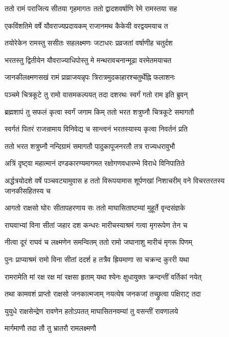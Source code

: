\twolineshloka
{ततो रामं पराजित्य सीतया गृहमागतः}
{ततो द्वादशवर्षाणि रेमे रामस्तया सह}%

\twolineshloka
{एकविंशतिमे वर्षे यौवराज्यप्रदायकम्}
{राजानमथ कैकेयी वरद्वयमयाच त}%

\twolineshloka
{तयोरेकेन रामस्तु ससीतः सहलक्ष्मणः}
{जटाधरः प्रव्रजतां वर्षाणीह चतुर्दश}%

\twolineshloka
{भरतस्तु द्वितीयेन यौवराज्याधिपोस्तु मे}
{मन्थरावचनान्मूढा वरमेतमयाचत}%

\twolineshloka
{जानकीलक्ष्मणसखं रामं प्राव्राजयन्नृपः}
{त्रिरात्रमुदकाहारश्चतुर्थेह्नि फलाशनः}%

\twolineshloka
{पञ्चमे चित्रकूटे तु रामो वासमकल्पयत्}
{तदा दशरथः स्वर्गं गतो राम इति ब्रुवन्}%

\twolineshloka
{ब्रह्मशापं तु सफलं कृत्वा स्वर्गं जगाम किम्}
{ततो भरत शत्रुघ्नौ चित्रकूटे समागतौ}%

\twolineshloka
{स्वर्गतं पितरं राजन्रामाय विनिवेद्य च}
{सान्त्वनं भरतस्यास्य कृत्वा निवर्तनं प्रति}%

\twolineshloka
{ततो भरत शत्रुघ्नौ नन्दिग्रामं समागतौ}
{पादुकापूजनरतौ तत्र राज्यधरावुभौ}%

\twolineshloka
{अत्रिं दृष्ट्वा महात्मानं दण्डकारण्यमागमत}
{रक्षोगणवधारम्भे विराधे विनिपातिते}%

\threelineshloka
{अर्द्धत्रयोदशे वर्षे पञ्चवट्यामुवास ह}
{ततो विरूपयामास शूर्पणखां निशाचरीम्}
{वने विचरतरतस्य जानकीसहितस्य च}%

\twolineshloka
{आगतो राक्षसो घोरः सीतापहरणाय सः}
{ततो माघासिताष्टम्यां मुहूर्ते वृन्दसंज्ञके}%

\twolineshloka
{राघवाभ्यां विना सीतां जहार दश कन्धरः}
{मारीचस्याश्रमं गत्वा मृगरूपेण तेन च}%

\twolineshloka
{नीत्वा दूरं राघवं च लक्ष्मणेन समन्वितम्}
{ततो रामो जघानाशु मारीचं मृगरू पिणम्}%

\twolineshloka
{पुनः प्राप्याश्रमं रामो विना सीतां ददर्श ह}
{तत्रैव ह्रियमाणा सा चक्रन्द कुररी यथा}%

\twolineshloka
{रामरामेति मां रक्ष रक्ष मां रक्षसा हृताम्}
{यथा श्येनः क्षुधायु्क्तः क्रन्दन्तीं वर्तिकां नयेत्}%

\twolineshloka
{तथा कामवशं प्राप्तो राक्षसो जनकात्मजाम्}
{नयत्येष जनकजां तच्छ्रुत्वा पक्षिराट् तदा}%

\twolineshloka
{युयुधे राक्षसेन्द्रेण रावणेन हतोऽपतत्}
{माघासितनवम्यां तु वसन्तीं रावणालये}%

\onelineshloka
{मार्गमाणौ तदा तौ तु भ्रातरौ रामलक्ष्मणौ}%

